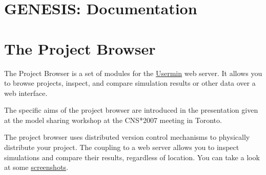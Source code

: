 \documentclass[12pt]{article}
\begin{document}
\section*{GENESIS: Documentation}

\section*{The Project Browser}

The Project Browser is a set of modules for the \href{http://www.webmin.com/usermin.html}{Usermin} web server. It allows you to browse projects, inspect, and compare simulation results or other data over a web interface.

The specific aims of the project browser are introduced in the presentation given at the model sharing workshop at the CNS*2007 meeting in Toronto.

The project browser uses distributed version control mechanisms to physically distribute your project. The coupling to a web server allows you to inspect simulations and compare their results, regardless of location. You can take a look at some \href{../project-browser-screenshots/project-browser-screenshots.tex}{screenshots}. 
\end{document}
